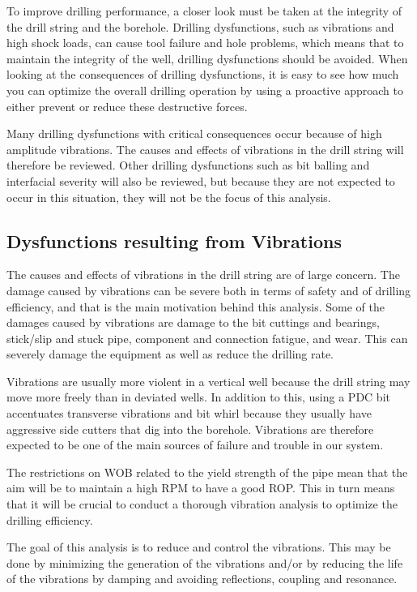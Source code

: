To improve drilling performance, a closer look must be taken at the integrity of the drill string and the borehole. Drilling dysfunctions, such as vibrations and high shock loads, can cause tool failure and hole problems, which means that to maintain the integrity of the well, drilling dysfunctions should be avoided. When looking at the consequences of drilling dysfunctions, it is easy to see how much you can optimize the overall drilling operation by using a proactive approach to either prevent or reduce these destructive forces.	

Many drilling dysfunctions with critical consequences occur because of high amplitude vibrations. The causes and effects of vibrations in the drill string will therefore be reviewed. Other drilling dysfunctions such as bit balling and interfacial severity will also be reviewed, but because they are not expected to occur in this situation, they will not be the focus of this analysis. 



\subsection{Dysfunctions resulting from Vibrations}
The causes and effects of vibrations in the drill string are of large concern. The damage caused by vibrations can be severe both in terms of safety and of drilling efficiency, and that is the main motivation behind this analysis.
Some of the damages caused by vibrations are damage to the bit cuttings and bearings, stick/slip and stuck pipe, component and connection fatigue, and wear. This can severely damage the equipment as well as reduce the drilling rate.

Vibrations are usually more violent in a vertical well because the drill string may move more freely than in deviated wells. In addition to this, using a PDC bit accentuates transverse vibrations and bit whirl because they usually have aggressive side cutters that dig into the borehole. Vibrations are therefore expected to be one of the main sources of failure and trouble in our system. 

The restrictions on WOB related to the yield strength of the pipe mean that the aim will be to maintain a high RPM to have a good ROP. This in turn means that it will be crucial to conduct a thorough vibration analysis to optimize the drilling efficiency.

The goal of this analysis is to reduce and control the vibrations. This may be done by minimizing the generation of the vibrations and/or by reducing the life of the vibrations by damping and avoiding reflections, coupling and resonance. 


